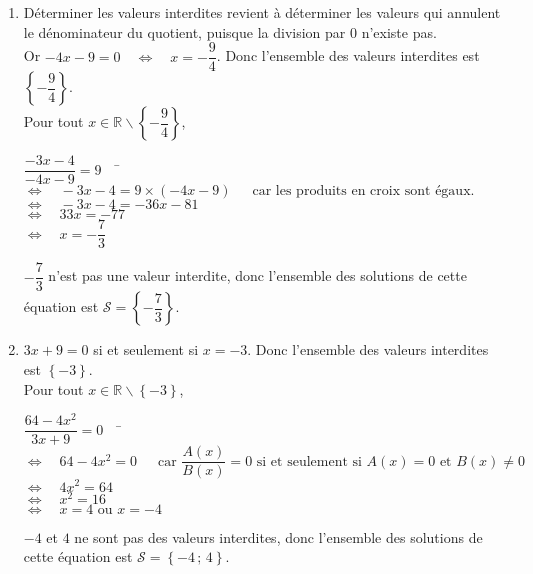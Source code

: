 \documentclass[a4paper,11pt,exos]{nsi} %
\begin{document}
\begin{enumerate}
    \item Déterminer les valeurs interdites revient à déterminer les valeurs qui annulent le dénominateur du quotient, puisque la division par $0$ n'existe pas.\\Or $-4x-9=0\quad \iff \quad x=-\dfrac{9}{4}$. Donc l'ensemble des valeurs interdites est  $\left\{-\dfrac{9}{4}\right\}$. \\
    Pour tout $x\in \mathbb{R}\smallsetminus\left\{-\dfrac{9}{4}\right\}$,
    \begin{tabbing}
        $\dfrac{-3x-4}{-4x-9}=9 \quad$  \=  $\iff \quad -3x-4=9\times(-4x-9)\,\,\,\,\,\,\,\text{ car les produits en croix sont égaux.}$\\
        \>  $\iff\quad  -3x-4= -36x-81$\\
        \>  $\iff\quad  33x= -77$\\
        \>  $\iff\quad  x=-\dfrac{7}{3}$
    \end{tabbing}
    $-\dfrac{7}{3}$ n'est pas une valeur interdite, donc l'ensemble des solutions de cette équation est  $\mathcal{S}=\left\{-\dfrac{7}{3}\right\}$.


    \item $3x+9=0$ si et seulement si  $x=-3$. Donc l'ensemble des valeurs interdites est  $\left\{-3\right\}$.\\
    Pour tout $x\in \mathbb{R}\smallsetminus\left\{-3\right\}$,
    \begin{tabbing}
        $\dfrac{64-4x^2}{3x+9}=0 \quad$ \=  $\iff\quad 64-4x^2=0\,\,\,\,\,\,\, \text{ car }\dfrac{A(x)}{B(x)}=0 \text { si et seulement si } A(x)=0 \text { et } B(x)\neq 0$\\
        \>  $\iff\quad  4x^2=64$\\
        \>  $\iff\quad  x^2=16$\\
        \>  $\iff\quad  x= 4\text{ ou } x= -4$
    \end{tabbing}
    $-4$ et $4$ ne sont pas des valeurs interdites, donc l'ensemble des solutions de cette équation est  $\mathcal{S}=\left\{-4\,;\,4\right\}$.


\end{enumerate}
\end{document}
